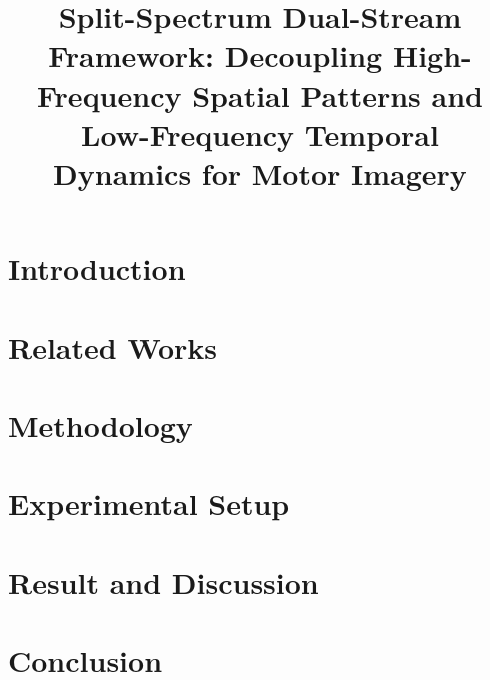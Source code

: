 \documentclass[conference]{IEEEtran}
\begin{document}
\title{Split-Spectrum Dual-Stream Framework: Decoupling High-Frequency Spatial Patterns and Low-Frequency Temporal Dynamics for Motor Imagery}

\author{
}

\maketitle

\begin{abstract}

\end{abstract}
\begin{IEEEkeywords}
  
\end{IEEEkeywords}

\section{Introduction}

\section{Related Works}

\section{Methodology}

\section{Experimental Setup}

\section{Result and Discussion}

\section{Conclusion}




\end{document}
